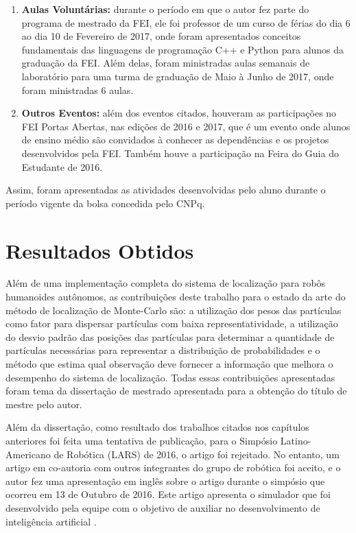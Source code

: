 \documentclass[
  12pt,       %
  oneside,
  a4paper,      %
  english,      %
  french,       %
  spanish,      %
  brazil,       %
  ]{abntex2}
\begin{document}
\begin{enumerate}
  \item \textbf{Aulas Voluntárias:} durante o período em que o autor fez parte do programa de mestrado da FEI, ele foi professor de um curso de férias do dia 6 ao dia 10 de Fevereiro de 2017, onde foram apresentados conceitos fundamentais das linguagens de programação C++ e Python para alunos da graduação da FEI.
  Além delas, foram ministradas aulas semanais de laboratório para uma turma de graduação de Maio à Junho de 2017, onde foram ministradas 6 aulas.

  \item \textbf{Outros Eventos:} além dos eventos citados, houveram as participações no FEI Portas Abertas, nas edições de 2016 e 2017, que é um evento onde alunos de ensino médio são convidados à conhecer as dependências e os projetos desenvolvidos pela FEI.
  Também houve a participação na Feira do Guia do Estudante de 2016.

\end{enumerate}

Assim, foram apresentadas as atividades desenvolvidas pelo aluno durante o período vigente da bolsa concedida pelo CNPq.


\chapter{Resultados Obtidos}

Além de uma implementação completa do sistema de localização para robôs humanoides autônomos, as contribuições deste trabalho para o estado da arte do método de localização de Monte-Carlo são: a utilização dos pesos das partículas como fator para dispersar partículas com baixa representatividade, a utilização do desvio padrão das posições das partículas para determinar a quantidade de partículas necessárias para representar a distribuição de probabilidades e o método que estima qual observação deve fornecer a informação que melhora o desempenho do sistema de localização.
Todas essas contribuições apresentadas foram tema da dissertação de mestrado apresentada para a obtenção do título de mestre pelo autor.

Além da dissertação, como resultado dos trabalhos citados nos capítulos anteriores foi feita uma tentativa de publicação, para o Simpósio Latino-Americano de Robótica (LARS) de 2016, o artigo foi rejeitado.
No entanto, um artigo em co-autoria com outros integrantes do grupo de robótica foi aceito, e o autor fez uma apresentação em inglês sobre o artigo durante o simpósio que ocorreu em 13 de Outubro de 2016.
Este artigo apresenta o simulador que foi desenvolvido pela equipe com o objetivo de auxiliar no desenvolvimento de inteligência artificial \cite{perico2016robot}.
\end{document}
